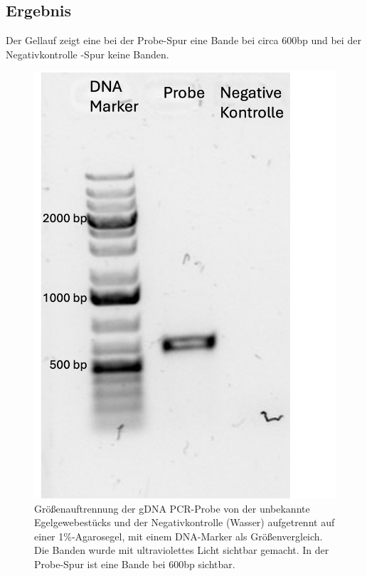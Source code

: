 \documentclass[oneside,10pt,a4paper]{report}
\begin{document}
			
			\subsection{Ergebnis}
				Der Gellauf zeigt eine bei der Probe-Spur eine Bande bei circa 600bp und bei der Negativkontrolle -Spur keine Banden.
				
				\begin{figure}[H]
					\centering
					\includegraphics[scale=0.7]{gel.png}
					\caption{Größenauftrennung der gDNA PCR-Probe von der unbekannte Egelgewebestücks und der Negativkontrolle (Wasser) aufgetrennt auf einer 1$\%$-Agarosegel, mit einem DNA-Marker als Größenvergleich. Die Banden wurde mit ultraviolettes Licht sichtbar gemacht. In der Probe-Spur ist eine Bande bei 600bp sichtbar.}
					\label{fig:Agarosegel}
				\end{figure}
				
\end{document}
